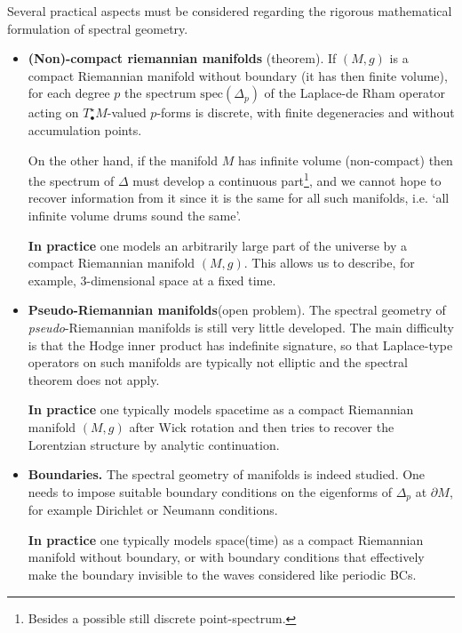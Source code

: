 \documentclass[../geometry_main.tex]{subfiles}
\begin{document}
\begin{mytheorem}
%
Several practical aspects must be considered regarding the rigorous mathematical formulation of spectral geometry.
%
\begin{itemize}
\item \textbf{(Non)-compact riemannian manifolds} (theorem).
If \((M,g)\) is a compact Riemannian manifold without boundary (it has then finite volume), for each degree $p$ the spectrum \(\mathrm{spec}(\Delta_p)\) of the Laplace-de Rham operator acting on $T^\star_\bullet M$-valued $p$-forms is discrete, with finite degeneracies and without accumulation points.

On the other hand, if the manifold \(M\) has infinite volume (non-compact) then the spectrum of \(\Delta\) must develop a continuous part\footnote{Besides a possible still discrete point-spectrum.}, and we cannot hope to recover information from it since it is the same for all such manifolds, i.e. `all infinite volume drums sound the same'.

\textbf{In practice} one models an arbitrarily large part of the universe by a compact Riemannian manifold \((M,g)\).  This allows us to describe, for example, 3-dimensional space at a fixed time.
%
\item \textbf{Pseudo-Riemannian manifolds}(open problem).
The spectral geometry of \emph{pseudo}-Riemannian manifolds is still very little developed.
The main difficulty is that the Hodge inner product has indefinite signature, so that Laplace-type operators on such manifolds are typically not elliptic and the spectral theorem does not apply.

\textbf{In practice} one typically models spacetime as a compact Riemannian manifold \((M,g)\) after Wick rotation and then tries to recover the Lorentzian structure by analytic continuation.
%
\item \textbf{Boundaries.} The spectral geometry of manifolds is indeed studied.
One needs to impose suitable boundary conditions on the eigenforms of \(\Delta_p\) at \(\partial M\), for example Dirichlet or Neumann conditions.

\textbf{In practice} one typically models space(time) as a compact Riemannian manifold without boundary, or with boundary conditions that effectively make the boundary invisible to the waves considered like periodic BCs.
%
\end{itemize}

\end{mytheorem}
\end{document}
